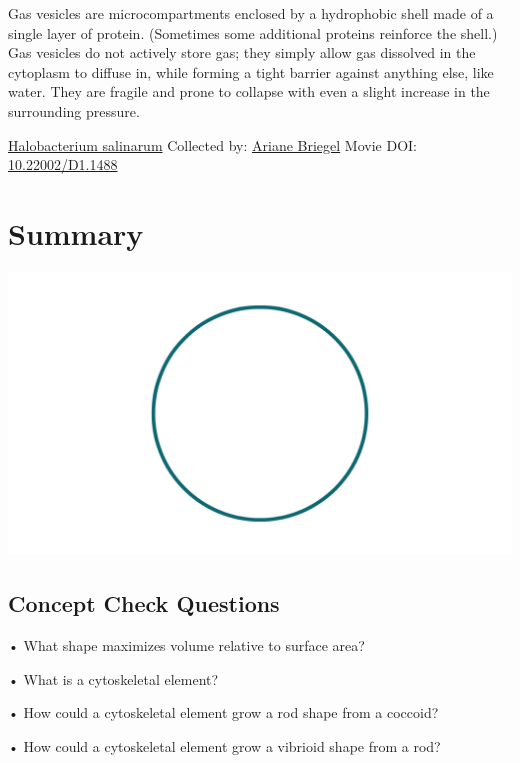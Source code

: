 \documentclass[]{tufte-book}
\begin{document}
Gas vesicles are microcompartments enclosed by a hydrophobic shell made of a single layer of protein. (Sometimes some additional proteins reinforce the shell.) Gas vesicles do not actively store gas; they simply allow gas dissolved in the cytoplasm to diffuse in, while forming a tight barrier against anything else, like water. They are fragile and prone to collapse with even a slight increase in the surrounding pressure.



\hypertarget{htmlwidget-2ecd3bc765dfc7df9736}{}

\label{fig:3-7a}\protect\hyperlink{tree}{Halobacterium salinarum} Collected by: \protect\hyperlink{ariane_briegel}{Ariane Briegel} Movie DOI: \href{https://doi.org/10.22002/D1.1488}{10.22002/D1.1488}

\hypertarget{summary-1}{%
\section{Summary}\label{summary-1}}

\includegraphics{img/summaries/03_Shape}

\hypertarget{concept-check-questions-1}{%
\subsection*{Concept Check Questions}\label{concept-check-questions-1}}

• What shape maximizes volume relative to surface area?

• What is a cytoskeletal element?

• How could a cytoskeletal element grow a rod shape from a coccoid?

• How could a cytoskeletal element grow a vibrioid shape from a rod?
\end{document}
